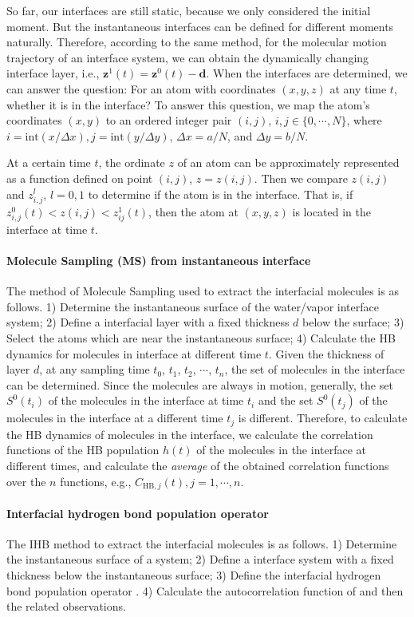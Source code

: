 So far, our interfaces are still static, because we only considered the initial moment. 
But the instantaneous interfaces can be defined for different moments naturally. 
Therefore, according to the same method, for the molecular motion trajectory of an interface system, 
we can obtain the dynamically changing interface layer, i.e., ${\mathbf z}^1(t)={\mathbf z}^0(t)-{\mathbf d}$. 
When the interfaces are determined, we can answer the question: For an atom with coordinates $(x, y, z)$ at any time $t$, whether it is in the interface?
To answer this question, we map the atom's coordinates $(x, y)$ to an ordered integer pair $(i, j)$, $i,j \in  \{0,\cdots,N\}$, 
where $i = \text{int}(x /\Delta x), j = \text{int}(y/\Delta y)$, $\Delta x = a/N$, and $\Delta y = b/N$.
 
At a certain time $t$, the ordinate $z$ of an atom can be approximately represented as a function defined on point $(i, j)$, $z=z(i,j)$. 
Then we compare $z(i,j)$ and $z^l_{i,j}$, $l=0,1$ to determine if the atom is in the interface. 
That is, if $z^0_{i,j}(t)<z(i,j)<z^1_{ij}(t)$, then the atom at $(x,y,z)$ is located in the interface at time $t$.

\paragraph{Molecule Sampling (MS) from instantaneous interface}
The method of Molecule Sampling used to extract the interfacial molecules is as follows. 
1) Determine the instantaneous surface of the water/vapor interface system;
2) Define a interfacial layer with a fixed thickness $d$ below the surface; 
3) Select the atoms which are near the instantaneous surface;
4) Calculate the HB dynamics for molecules in interface at different time $t$.
Given the thickness of layer $d$, at any sampling time $t_0$, $t_1$, $t_2$, $\cdots$, $t_n$, the set of molecules in the interface can be determined. 
Since the molecules are always in motion, generally, the set $S^0(t_i)$ of the molecules in the interface at time $t_i$ 
and the set $S^0(t_j)$ of the molecules in the interface at a different time $t_j$ is different. 
Therefore, to calculate the HB dynamics of molecules in the interface, we calculate the correlation functions of 
the HB population $h(t)$ of the molecules in the interface at different times, 
and calculate the \emph{average} of the obtained correlation functions 
over the $n$ functions, e.g., $C_{\text{HB},j}(t), j=1,\cdots,n$.
 
\paragraph{Interfacial hydrogen bond population operator \hbos} 
The IHB method to extract the interfacial molecules is as follows. 
1) Determine the instantaneous surface of a system;
2) Define a interface system with a fixed thickness below the instantaneous surface; 
3) Define the interfacial hydrogen bond population operator \hbos.
4) Calculate the autocorrelation function of \hbos and then the related observations. 

